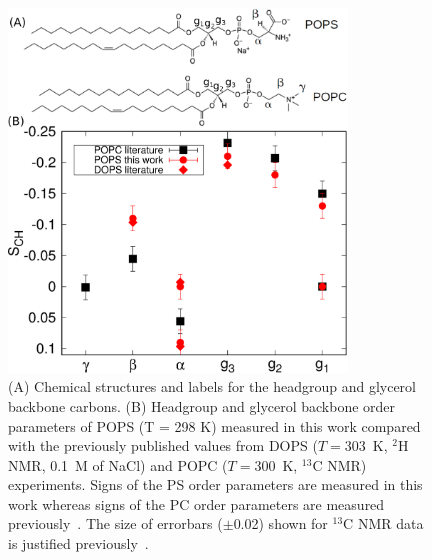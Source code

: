 \documentclass[journal=jpcbfk,manuscript=article]{achemso}
\newcommand{\todo}[1]{\textcolor{red}{#1}}
\begin{document}
\begin{figure}[!htb]
  \centering
  \includegraphics[width=9.0cm]{../Figs/PCPScomp.eps}
  \caption{\label{HGorderParameters}
    (A) Chemical structures and labels for the headgroup and glycerol backbone carbons.
    (B) Headgroup and glycerol backbone order parameters of POPS (T = 298 K) measured in this work compared
    with the previously published values from DOPS ($T=303$~K, $^2$H NMR, 0.1~M of NaCl) \cite{browning80} and 
    POPC  ($T=300$~K, $^{13}$C NMR) \cite{ferreira13} experiments. Signs of the PS order parameters
    are measured in this work whereas signs of the PC order parameters are measured previously~\cite{ferreira16}.
    The size of errorbars ($\pm$0.02) shown for $^{13}$C NMR data is justified previously~\cite{botan15,ollila16}. 
  }
\end{figure}
\end{document}
